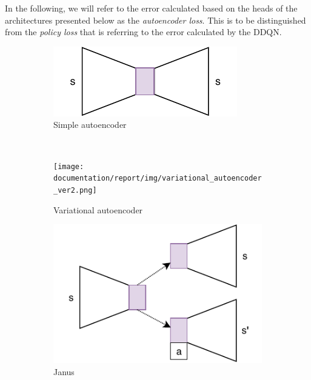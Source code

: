 In the following, we will refer to the error calculated based on the heads of the architectures presented below as the \textit{autoencoder loss}. This is to be distinguished from the \textit{policy loss} that is referring to the error calculated by the DDQN.

\begin{figure}[ht!]
	\centering
	\begin{subfigure}{0.45\columnwidth}
		\centering
		\includegraphics[width=\linewidth]{img/very_simple_autoencoder.pdf}
		\caption{Simple autoencoder}
		\label{subfig:repr_learner_simple_autoencoder}
	\end{subfigure}%
	~ 
	\begin{subfigure}{0.45\columnwidth}
		\centering
		\texttt{[image: documentation/report/img/variational\_autoencoder\_ver2.png]}
		\caption{Variational autoencoder}
		\label{subfig:repr_learner_vae}
	\end{subfigure}
	\begin{subfigure}{0.5\columnwidth}
		\centering
		\includegraphics[width=\linewidth]{img/janus.pdf}
		\caption{Janus}
		\label{subfig:repr_learner_janus}
	\end{subfigure}%
	~ 
	\begin{subfigure}{0.5\columnwidth}

\end{subfigure}
\end{figure}
